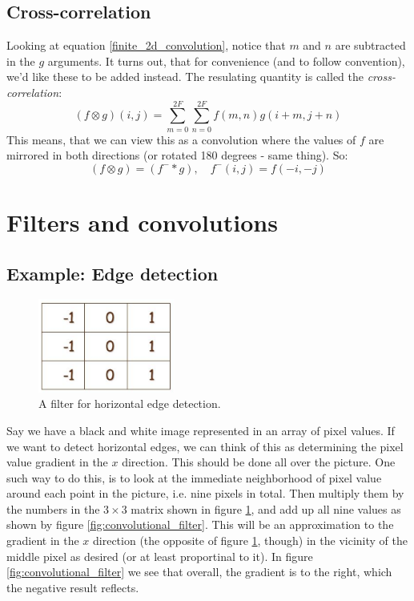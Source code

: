 \documentclass[12pt, a4paper]{article}
\numberwithin{equation}{section}
\begin{document}
\subsection{Cross-correlation}
Looking at equation \ref{finite_2d_convolution}, notice that $m$ and $n$ are subtracted in the $g$ arguments. It turns out, that for convenience (and to follow convention), we'd like these to be added instead. The resulating quantity is called the \textit{cross-correlation}:
\begin{equation}
(f\otimes g)(i,j)=\sum_{m=0}^{2F}\sum_{n=0}^{2F}f(m,n)g(i+m,j+n)
\label{cross_correlation}
\end{equation}
This means, that we can view this as a convolution where the values of $f$ are mirrored in both directions (or rotated 180 degrees - same thing). So:
\begin{equation}
(f\otimes g)=(f^-*g),\quad f^-(i,j)=f(-i,-j)
\end{equation}

\section{Filters and convolutions}

\subsection{Example: Edge detection}

\begin{figure}
\centering
\includegraphics[width=0.4\textwidth]{horizontal_edge}
\caption{A filter for horizontal edge detection.}
\label{fig:horizontal_edge}
\end{figure}

Say we have a black and white image represented in an array of pixel values. If we want to detect horizontal edges, we can think of this as determining the pixel value gradient in the $x$ direction. This should be done all over the picture. One such way to do this, is to look at the immediate neighborhood of pixel value around each point in the picture, i.e. nine pixels in total. Then multiply them by the numbers in the $3\times 3$ matrix shown in figure \ref{fig:horizontal_edge}, and add up all nine values as shown by figure \ref{fig:convolutional_filter}. This will be an approximation to the gradient in the $x$ direction (the opposite of figure \ref{fig:horizontal_edge}, though) in the vicinity of the middle pixel as desired (or at least proportinal to it). In figure \ref{fig:convolutional_filter} we see that overall, the gradient is to the right, which the negative result reflects.
\end{document}
